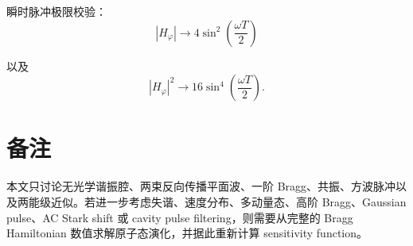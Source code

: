 \documentclass[UTF8,12pt,a4paper,fontset=fandol]{ctexart}
\begin{document}
瞬时脉冲极限校验：
\[
\boxed{
|H_\varphi|
\rightarrow
4\sin^2\left(\frac{\omega T}{2}\right)
}
\]

以及
\[
\boxed{
|H_\varphi|^2
\rightarrow
16\sin^4\left(\frac{\omega T}{2}\right)
}.
\]

\section*{备注}

本文只讨论无光学谐振腔、两束反向传播平面波、一阶 Bragg、共振、方波脉冲以及两能级近似。若进一步考虑失谐、速度分布、多动量态、高阶 Bragg、Gaussian pulse、AC Stark shift 或 cavity pulse filtering，则需要从完整的 Bragg Hamiltonian 数值求解原子态演化，并据此重新计算 sensitivity function。
\end{document}
